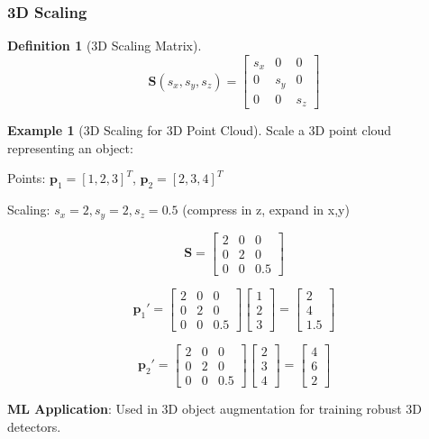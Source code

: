 \documentclass[12pt,a4paper]{article}
\theoremstyle{definition}
\newtheorem{definition}{Definition}[section]
\newtheorem{example}{Example}[section]
\begin{document}
\subsubsection{3D Scaling}

\begin{definition}[3D Scaling Matrix]
\[
\mathbf{S}(s_x, s_y, s_z) = \begin{bmatrix}
s_x & 0 & 0 \\
0 & s_y & 0 \\
0 & 0 & s_z
\end{bmatrix}
\]
\end{definition}

\begin{example}[3D Scaling for 3D Point Cloud]
Scale a 3D point cloud representing an object:

Points: $\mathbf{p}_1 = [1, 2, 3]^T$, $\mathbf{p}_2 = [2, 3, 4]^T$

Scaling: $s_x = 2, s_y = 2, s_z = 0.5$ (compress in z, expand in x,y)

\[
\mathbf{S} = \begin{bmatrix}
2 & 0 & 0 \\
0 & 2 & 0 \\
0 & 0 & 0.5
\end{bmatrix}
\]

\[
\mathbf{p}_1' = \begin{bmatrix}
2 & 0 & 0 \\
0 & 2 & 0 \\
0 & 0 & 0.5
\end{bmatrix}
\begin{bmatrix}
1 \\ 2 \\ 3
\end{bmatrix}
= \begin{bmatrix}
2 \\ 4 \\ 1.5
\end{bmatrix}
\]

\[
\mathbf{p}_2' = \begin{bmatrix}
2 & 0 & 0 \\
0 & 2 & 0 \\
0 & 0 & 0.5
\end{bmatrix}
\begin{bmatrix}
2 \\ 3 \\ 4
\end{bmatrix}
= \begin{bmatrix}
4 \\ 6 \\ 2
\end{bmatrix}
\]

\textbf{ML Application}: Used in 3D object augmentation for training robust 3D detectors.
\end{example}
\end{document}
